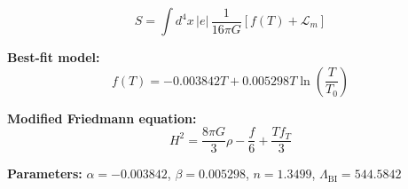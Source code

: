 
\begin{equation}
  S = \int d^4x \, |e| \, \frac{1}{16\pi G} \left[ f(T) + \mathcal{L}_m \right]
\end{equation}

\textbf{Best-fit model:}
\begin{equation}
  f(T) = -0.003842 T + 0.005298 T \ln\!\left(\frac{T}{T_0}\right)
\end{equation}

\textbf{Modified Friedmann equation:}
\begin{equation}
  H^2 = \frac{8\pi G}{3} \rho - \frac{f}{6} + \frac{T f_T}{3}
\end{equation}

\textbf{Parameters:}
$\alpha = -0.003842$, \quad
$\beta = 0.005298$, \quad
$n = 1.3499$, \quad
$\Lambda_{\text{BI}} = 544.5842$